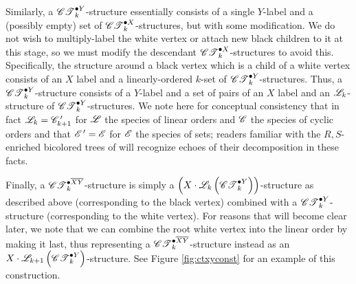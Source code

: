 \documentclass[sectionflow,singlespace,twoside,boldmathhdr,draft]{brandiss} %
\numberwithin{section}{chapter}
\numberwithin{figure}{chapter}
\begin{document}
Similarly, a $\pointed[Y]{\specname{CT}}_{k}$-structure essentially consists of a single $Y$-label and a (possibly empty) set of $\pointed[X]{\specname{CT}}_{k}$-structures, but with some modification.
We do not wish to multiply-label the white vertex or attach new black children to it at this stage, so we must modify the descendant $\pointed[X]{\specname{CT}}_{k}$-structures to avoid this.
Specifically, the structure around a black vertex which is a child of a white vertex consists of an $X$ label and a linearly-ordered $k$-set of $\pointed[Y]{\specname{CT}}_{k}$-structures.
Thus, a $\pointed[Y]{\specname{CT}}_{k}$-structure consists of a $Y$-label and a set of pairs of an $X$ label and an $\specname{L}_{k}$-structure of $\pointed[Y]{\specname{CT}}_{k}$-structures.
We note here for conceptual consistency that in fact $\specname{L}_{k} = \deriv{\specname{C}}_{k+1}$ for $\specname{L}$ the species of linear orders and $\specname{C}$ the species of cyclic orders and that $\deriv{\specname{E}} = \specname{E}$ for $\specname{E}$ the species of sets; readers familiar with the $R, S$-enriched bicolored trees of \cite[\S 3.2]{bll:species} will recognize echoes of their decomposition in these facts.

Finally, a $\pointed[\overline{XY}]{\specname{CT}}_{k}$-structure is simply a $\pbrac{X \cdot \specname{L}_{k} \pbrac{\pointed[Y]{\specname{CT}}_{k}}}$-structure as described above (corresponding to the black vertex) combined with a $\pointed[Y]{\specname{CT}}_{k}$-structure (corresponding to the white vertex).
For reasons that will become clear later, we note that we can combine the root white vertex into the linear order by making it last, thus representing a $\pointed[\overline{XY}]{\specname{CT}}_{k}$-structure instead as an $X \cdot \specname{L}_{k+1} \pbrac{\pointed[Y]{\specname{CT}}_{k}}$-structure.
See Figure \ref{fig:ctxyconst} for an example of this construction.
\end{document}
